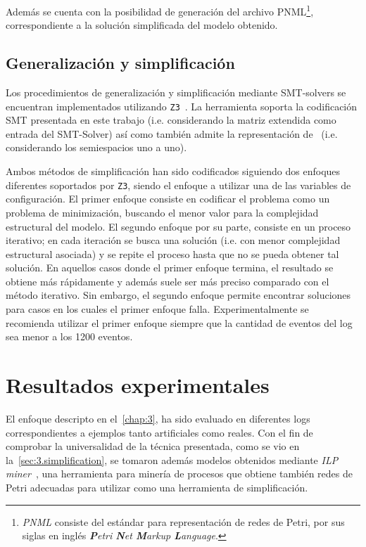 Además se cuenta con la posibilidad de generación del archivo PNML\footnote{\textit{PNML} consiste del estándar para representación
de redes de Petri, por sus siglas en inglés \textit{\textbf{P}etri \textbf{N}et \textbf{M}arkup \textbf{L}anguage}.},
correspondiente a la solución simplificada del modelo obtenido.

\subsection{Generalización y simplificación}
\label{sec:4.simplification}

Los procedimientos de generalización y simplificación mediante SMT-solvers se encuentran implementados utilizando \texttt{Z3}~\cite{MouraB08}. 
La herramienta soporta la codificación SMT presentada en este trabajo (i.e. considerando la matriz extendida
como entrada del SMT-Solver) así como también admite la representación de~\cite{LeonCB15} (i.e. considerando los semiespacios uno a uno).

Ambos métodos de simplificación han sido codificados siguiendo dos enfoques diferentes soportados por \texttt{Z3},
siendo el enfoque a utilizar una de las variables de configuración.
El primer enfoque consiste en codificar el problema como un problema de minimización, buscando 
el menor valor para la complejidad estructural del modelo.
El segundo enfoque por su parte, consiste en un proceso iterativo; en cada iteración se busca
una  solución (i.e. con menor complejidad estructural asociada) y se repite el proceso
hasta que no se pueda obtener tal solución.
En aquellos casos donde el primer enfoque termina, el resultado se obtiene más rápidamente y además 
suele ser más preciso comparado con el método iterativo. Sin embargo, el segundo enfoque
permite encontrar soluciones para casos en los cuales el primer enfoque falla.
Experimentalmente se recomienda utilizar el primer enfoque siempre que la cantidad de eventos del log
sea menor a los 1200 eventos.

\section{Resultados experimentales}
\label{sec:4.experiments}

El enfoque descripto en el~\autoref{chap:3}, ha sido evaluado en diferentes logs correspondientes
a ejemplos tanto artificiales como reales. Con el fin de comprobar la universalidad de la técnica presentada,
como se vio en la~\autoref{sec:3.simplification}, se tomaron además modelos obtenidos mediante \textit{ILP miner}~\cite{WDHS08},
una herramienta para minería de procesos que obtiene también redes de Petri adecuadas para utilizar \pachtool
como una herramienta de simplificación.

